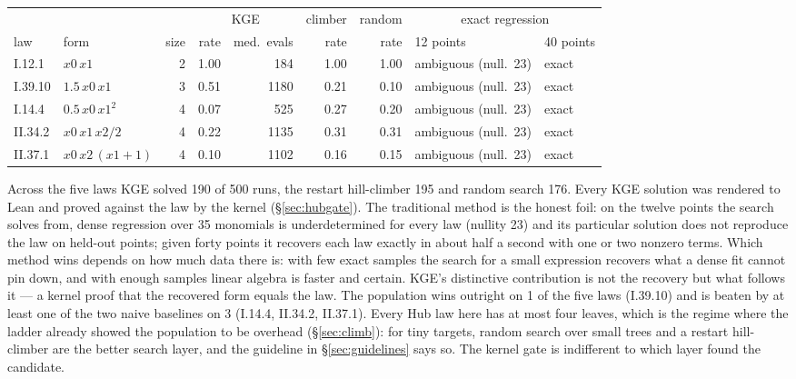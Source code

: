 \documentclass[11pt,a4paper]{article}
\theoremstyle{definition}
\theoremstyle{remark}
\begin{document}
\begin{center}
\small
\begin{tabular}{llrrrrrll}
\toprule
 & & & \multicolumn{2}{c}{KGE} & climber & random & \multicolumn{2}{c}{exact regression} \\
law & form & size & rate & med.\ evals & rate & rate & 12 points & 40 points \\
\midrule
I.12.1 & $x0\,x1$ & 2 & 1.00 & 184 & 1.00 & 1.00 & ambiguous (null.\ 23) & exact \\
I.39.10 & $1.5\,x0\,x1$ & 3 & 0.51 & 1180 & 0.21 & 0.10 & ambiguous (null.\ 23) & exact \\
I.14.4 & $0.5\,x0\,x1^2$ & 4 & 0.07 & 525 & 0.27 & 0.20 & ambiguous (null.\ 23) & exact \\
II.34.2 & $x0\,x1\,x2/2$ & 4 & 0.22 & 1135 & 0.31 & 0.31 & ambiguous (null.\ 23) & exact \\
II.37.1 & $x0\,x2\,(x1 + 1)$ & 4 & 0.10 & 1102 & 0.16 & 0.15 & ambiguous (null.\ 23) & exact \\
\bottomrule
\end{tabular}
\end{center}

Across the five laws KGE solved 190 of 500 runs, the restart hill-climber 195 and random search 176. Every KGE solution was rendered to Lean and proved against the law by the kernel (\S\ref{sec:hubgate}). The traditional method is the honest foil: on the twelve points the search solves from, dense regression over 35 monomials is underdetermined for every law (nullity 23) and its particular solution does not reproduce the law on held-out points; given forty points it recovers each law exactly in about half a second with one or two nonzero terms. Which method wins depends on how much data there is: with few exact samples the search for a small expression recovers what a dense fit cannot pin down, and with enough samples linear algebra is faster and certain. KGE's distinctive contribution is not the recovery but what follows it --- a kernel proof that the recovered form equals the law. The population wins outright on 1 of the five laws (I.39.10) and is beaten by at least one of the two naive baselines on 3 (I.14.4, II.34.2, II.37.1). Every Hub law here has at most four leaves, which is the regime where the ladder already showed the population to be overhead (\S\ref{sec:climb}): for tiny targets, random search over small trees and a restart hill-climber are the better search layer, and the guideline in \S\ref{sec:guidelines} says so. The kernel gate is indifferent to which layer found the candidate.
\end{document}
